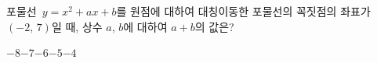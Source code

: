 포물선~$y=x^2+ax+b$를 원점에 대하여 대칭이동한 포물선의 꼭짓점의 좌표가 $(-2,\,7)$일 때, 상수 $a$, $b$에 대하여 $a+b$의 값은?
\begin{choices32}{$-8$}{$-7$}{$-6$}{$-5$}{$-4$}\end{choices32}
